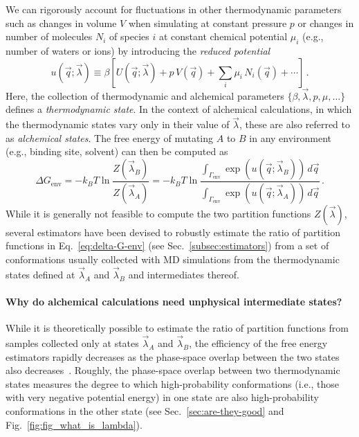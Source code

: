 \documentclass[9pt,bestpractices]{livecoms}
\begin{document}
We can rigorously account for fluctuations in other thermodynamic parameters such as changes in volume $V$ when simulating at constant pressure $p$ or changes in number of molecules $N_i$ of species $i$ at constant chemical potential $\mu_i$ (e.g., number of waters or ions) by introducing the \textit{reduced potential}~\cite{shirts2008statisticallya}
\begin{equation}\label{eq:reduced-potential}
u(\vec{q};\vec{\lambda}) \equiv \beta \left[ U(\vec{q};\vec{\lambda}) + p \, V(\vec{q}) + \sum_i \mu_i \, N_i(\vec{q}) + \cdots \right] \, .
\end{equation}
Here, the collection of thermodynamic and alchemical parameters $\{\beta, \vec{\lambda}, p, \mu, \ldots\}$ defines a \emph{thermodynamic state}.
In the context of alchemical calculations, in which the thermodynamic states vary only in their value of $\vec{\lambda}$, these are also referred to as \emph{alchemical states}.
The free energy of mutating $A$ to $B$ in any environment (e.g., binding site, solvent) can then be computed as
\begin{equation}\label{eq:delta-G-env}
    \Delta G_{\mathrm{env}} = - k_BT \ln \frac{Z(\vec{\lambda}_B)}{Z(\vec{\lambda}_A)} = - k_BT \ln \frac{\int_{\Gamma_{\mathrm{env}}} \exp\left( u(\vec{q}; \vec{\lambda}_B) \right) \, d\vec{q}}{\int_{\Gamma_{\mathrm{env}}} \exp\left( u(\vec{q}; \vec{\lambda}_A) \right) \, d\vec{q}} \, .
\end{equation}
While it is generally not feasible to compute the two partition functions $Z(\vec{\lambda})$, several estimators have been devised to robustly estimate the ratio of partition functions in Eq.~\ref{eq:delta-G-env} (see Sec.~\ref{subsec:estimators}) from a set of conformations usually collected with MD simulations from the thermodynamic states defined at $\vec{\lambda}_A$ and $\vec{\lambda}_B$ and intermediates thereof.

\paragraph{Why do alchemical calculations need unphysical intermediate states?}
While it is theoretically possible to estimate the ratio of partition functions from samples collected only at states $\vec{\lambda}_A$ and $\vec{\lambda}_B$, the efficiency of the free energy estimators rapidly decreases as the phase-space overlap between the two states also decreases~\cite{wu2005phasespaceb,wu2005phasespacec}.
Roughly, the phase-space overlap between two thermodynamic states measures the degree to which high-probability conformations (i.e., those with very negative potential energy) in one state are also high-probability conformations in the other state (see Sec.~\ref{sec:are-they-good} and Fig.~\ref{fig:fig_what_is_lambda}).
\end{document}
